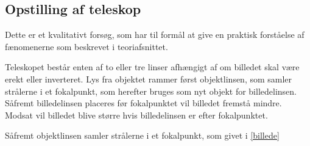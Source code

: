 \subsection{Opstilling af teleskop}
Dette er et kvalitativt forsøg, som har til formål at give en praktisk forståelse af fænomenerne som beskrevet i teoriafsnittet.

Teleskopet består enten af to eller tre linser afhængigt af om billedet skal være erekt eller inverteret. Lys fra objektet rammer først objektlinsen, som samler strålerne i et fokalpunkt, som herefter bruges som  nyt objekt for billedelinsen. Såfremt billedelinsen placeres før fokalpunktet vil billedet fremstå mindre. Modsat vil billedet blive større hvis billedelinsen er efter fokalpunktet.

Såfremt objektlinsen samler strålerne i et fokalpunkt, som givet i \cref{billede} 



